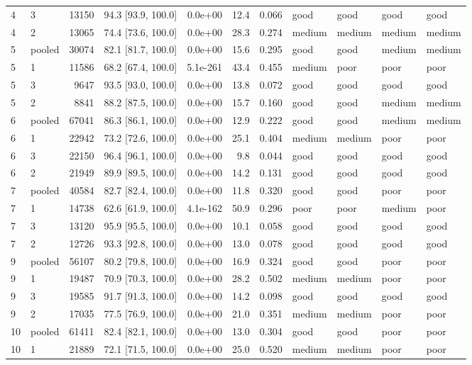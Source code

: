 \begin{longtable}{llrrrrrllll}
4 & 3 & 13150 & 94.3 [93.9, 100.0] & 0.0e+00 & 12.4 & 0.066 & good & good & good & good \\
4 & 2 & 13065 & 74.4 [73.6, 100.0] & 0.0e+00 & 28.3 & 0.274 & medium & medium & medium & medium \\
5 & pooled & 30074 & 82.1 [81.7, 100.0] & 0.0e+00 & 15.6 & 0.295 & good & good & medium & medium \\
5 & 1 & 11586 & 68.2 [67.4, 100.0] & 5.1e-261 & 43.4 & 0.455 & medium & poor & poor & poor \\
5 & 3 & 9647 & 93.5 [93.0, 100.0] & 0.0e+00 & 13.8 & 0.072 & good & good & good & good \\
5 & 2 & 8841 & 88.2 [87.5, 100.0] & 0.0e+00 & 15.7 & 0.160 & good & good & medium & medium \\
6 & pooled & 67041 & 86.3 [86.1, 100.0] & 0.0e+00 & 12.9 & 0.222 & good & good & medium & medium \\
6 & 1 & 22942 & 73.2 [72.6, 100.0] & 0.0e+00 & 25.1 & 0.404 & medium & medium & poor & poor \\
6 & 3 & 22150 & 96.4 [96.1, 100.0] & 0.0e+00 & 9.8 & 0.044 & good & good & good & good \\
6 & 2 & 21949 & 89.9 [89.5, 100.0] & 0.0e+00 & 14.2 & 0.131 & good & good & good & good \\
7 & pooled & 40584 & 82.7 [82.4, 100.0] & 0.0e+00 & 11.8 & 0.320 & good & good & poor & poor \\
7 & 1 & 14738 & 62.6 [61.9, 100.0] & 4.1e-162 & 50.9 & 0.296 & poor & poor & medium & poor \\
7 & 3 & 13120 & 95.9 [95.5, 100.0] & 0.0e+00 & 10.1 & 0.058 & good & good & good & good \\
7 & 2 & 12726 & 93.3 [92.8, 100.0] & 0.0e+00 & 13.0 & 0.078 & good & good & good & good \\
9 & pooled & 56107 & 80.2 [79.8, 100.0] & 0.0e+00 & 16.9 & 0.324 & good & good & poor & poor \\
9 & 1 & 19487 & 70.9 [70.3, 100.0] & 0.0e+00 & 28.2 & 0.502 & medium & medium & poor & poor \\
9 & 3 & 19585 & 91.7 [91.3, 100.0] & 0.0e+00 & 14.2 & 0.098 & good & good & good & good \\
9 & 2 & 17035 & 77.5 [76.9, 100.0] & 0.0e+00 & 21.0 & 0.351 & medium & medium & poor & poor \\
10 & pooled & 61411 & 82.4 [82.1, 100.0] & 0.0e+00 & 13.0 & 0.304 & good & good & poor & poor \\
10 & 1 & 21889 & 72.1 [71.5, 100.0] & 0.0e+00 & 25.0 & 0.520 & medium & medium & poor & poor \\

\end{longtable}
